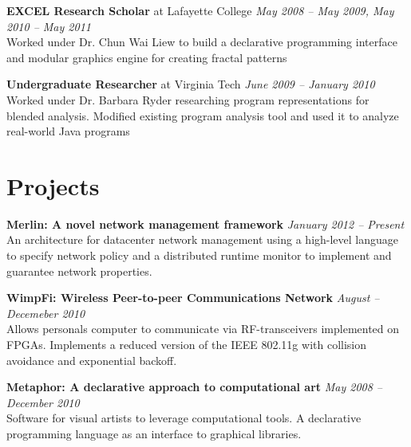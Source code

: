 \documentclass[margin,line]{resume}
\begin{document}
\begin{resume}
    {\bf EXCEL Research Scholar} at Lafayette College \hfill
    {\it May 2008 -- May 2009, May 2010 -- May 2011}\\
    Worked under Dr. Chun Wai Liew to build a declarative programming interface
    and modular graphics engine for creating fractal patterns

    {\bf Undergraduate Researcher} at Virginia Tech \hfill
    {\it June 2009 -- January 2010}\\
    Worked under Dr. Barbara Ryder researching program representations for
    blended analysis. Modified existing program analysis tool and used it to
    analyze real-world Java programs


    \section{Projects}
    {\bf Merlin: A novel network management framework} \hfill
    {\it January 2012 -- Present }\\
    An architecture for datacenter network management using a high-level
    language to specify network policy and a distributed runtime monitor to
    implement and guarantee network properties.


    {\bf WimpFi: Wireless Peer-to-peer Communications Network} \hfill
    {\it August -- Decemeber 2010}\\
    Allows personals computer to communicate via RF-transceivers implemented on
    FPGAs. Implements a reduced version of the IEEE 802.11g with collision
    avoidance and exponential backoff.

    {\bf Metaphor: A declarative approach to computational art} \hfill
    {\it May 2008 -- December 2010}\\
    Software for visual artists to leverage computational tools. A declarative
    programming language as an interface to graphical libraries.


\end{resume}
\end{document}
